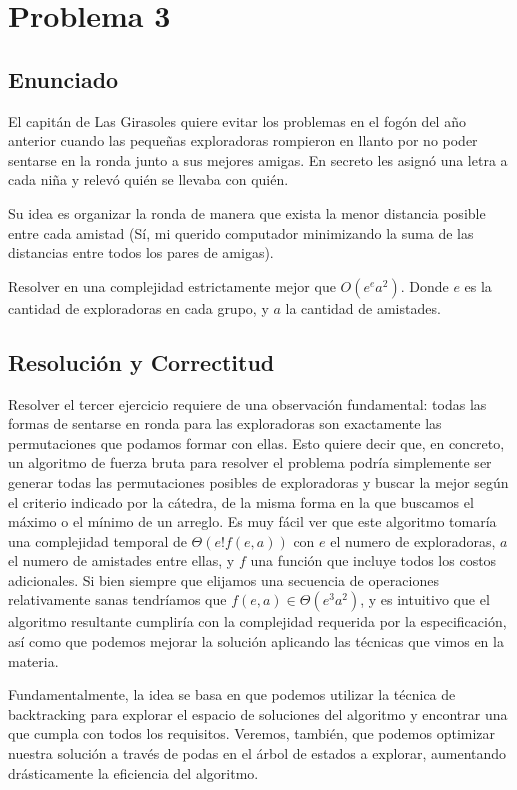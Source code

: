\documentclass{article}
\theoremstyle{definition}
\theoremstyle{remark}
\begin{document}
\pagebreak

\section{Problema 3}

\subsection{Enunciado}

El capitán de Las Girasoles quiere evitar los problemas en el fogón del año anterior cuando las pequeñas exploradoras rompieron en llanto por no poder sentarse en la ronda junto a sus mejores amigas. En secreto les asignó una letra a cada niña y relevó quién se llevaba con quién.

Su idea es organizar la ronda de manera que exista la menor distancia posible entre cada amistad (Sí, mi querido computador minimizando la suma de las distancias entre todos los pares de amigas).

Resolver en una complejidad estrictamente mejor que $O(e^e a^2)$. Donde $e$ es la cantidad de exploradoras en cada grupo, y $a$ la cantidad de amistades.

\subsection{Resolución y Correctitud}

Resolver el tercer ejercicio requiere de una observación fundamental: todas las formas de sentarse en ronda para las exploradoras son exactamente las permutaciones que podamos formar con ellas. Esto quiere decir que, en concreto, un algoritmo de fuerza bruta para resolver el problema podría simplemente ser generar todas las permutaciones posibles de exploradoras y buscar la mejor según el criterio indicado por la cátedra, de la misma forma en la que buscamos el máximo o el mínimo de un arreglo. Es muy fácil ver que este algoritmo tomaría una complejidad temporal de $\Theta(e! f(e, a))$ con $e$ el numero de exploradoras, $a$ el numero de amistades entre ellas, y $f$ una función que incluye todos los costos adicionales. Si bien siempre que elijamos una secuencia de operaciones relativamente sanas tendríamos que $f(e, a) \in \Theta(e^3 a^2)$, y es intuitivo que el algoritmo resultante cumpliría con la complejidad requerida por la especificación, así como que podemos mejorar la solución aplicando las técnicas que vimos en la materia.

Fundamentalmente, la idea se basa en que podemos utilizar la técnica de backtracking para explorar el espacio de soluciones del algoritmo y encontrar una que cumpla con todos los requisitos. Veremos, también, que podemos optimizar nuestra solución a través de podas en el árbol de estados a explorar, aumentando drásticamente la eficiencia del algoritmo.
\end{document}
